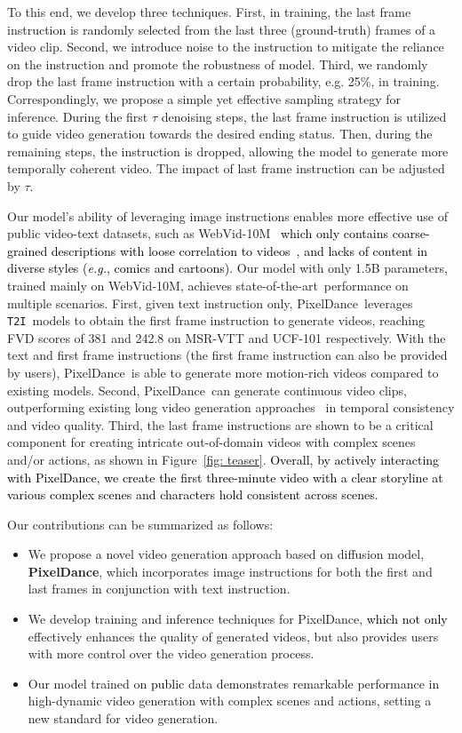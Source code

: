 \documentclass[10pt,twocolumn,letterpaper]{article}
\newcommand{\tcb}{\textcolor{black}}
\newcommand{\tcr}{\textcolor{black}}
\newcommand{\tcg}{\textcolor{black}}
\newcommand{\sota}{{state-of-the-art}}
\newcommand{\ti}{{\texttt{T2I}}}
\newcommand{\ours}{{PixelDance}}
\begin{document}
To this end, we develop three techniques. First, in training, the last frame instruction is randomly selected from the last three (ground-truth) frames of a video clip. Second, we introduce noise to the instruction to mitigate the reliance on the instruction and promote the robustness of model. Third, we randomly drop the last frame instruction with a certain probability, e.g. 25\%, in training. Correspondingly, we propose a simple yet effective sampling strategy for inference. During the first $\tau$ denoising steps, the last frame instruction is utilized to guide video generation towards the desired ending status. Then, during the remaining steps, the instruction is dropped, allowing the model to generate more temporally coherent video. The impact of last frame instruction can be adjusted by $\tau$.  


Our model's ability of leveraging image instructions enables more effective use of public video-text datasets, such as WebVid-10M~\cite{bain2021WEBVID} \tcb{which only contains coarse-grained descriptions with loose correlation to videos~\cite{singer2022make}, and lacks of content in diverse styles (\textit{e.g.}, comics and cartoons).} 
Our model with only 1.5B parameters, trained mainly on WebVid-10M, achieves \sota~performance on multiple scenarios. First, given text instruction only, \ours~leverages \ti~models to obtain the first frame instruction to generate videos, reaching FVD scores of 381 and 242.8 on MSR-VTT \cite{xu2016msr-vtt} and UCF-101 \cite{soomro2012UCF} respectively. With the text and first frame instructions (the first frame instruction can also be provided by users), \ours~is able to generate more motion-rich videos compared to existing models. Second, \ours~can generate continuous video clips, outperforming existing long video generation approaches~\cite{he2022LVDM,ge2022TATS} in temporal consistency and video quality. Third, the last frame instructions are shown to be a critical component for creating intricate out-of-domain videos with complex scenes and/or actions, as shown in Figure~\ref{fig: teaser}. 
\tcr{Overall, by actively interacting with \ours, we create the first three-minute video with a clear storyline at various complex scenes and characters hold consistent across scenes. }


Our contributions can be summarized as follows:
\begin{itemize}
\item We propose a novel video generation approach based on diffusion model, \textbf{\ours}, which incorporates image instructions for both the first and last frames in conjunction with text instruction.


\item We develop training and inference techniques for \ours, \tcg{which not only} effectively enhances the quality of generated videos, but also provides users with more control over the video generation process.


\item Our model trained on \tcg{public} data demonstrates remarkable performance in high-dynamic video generation with complex scenes and actions, setting a new standard for video generation.
\end{itemize}
\end{document}
